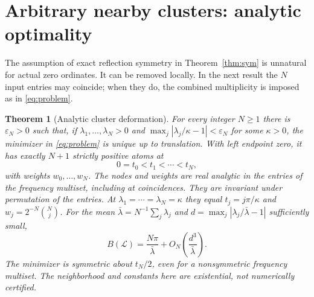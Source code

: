 \documentclass[11pt]{article}
\newtheorem{theorem}{Theorem}[section]
\theoremstyle{remark}\newtheorem{remark}[theorem]{Remark}
\begin{document}
\section{Arbitrary nearby clusters: analytic optimality}\label{sec:local}
The assumption of exact reflection symmetry in Theorem~\ref{thm:sym} is unnatural for actual zero ordinates. It can be removed locally. In the next result the $N$ input entries may coincide; when they do, the combined multiplicity is imposed as in \eqref{eq:problem}.
\begin{theorem}[Analytic cluster deformation]\label{thm:local}
For every integer $N\ge1$ there is $\varepsilon_N>0$ such that, if $\lambda_1,\ldots,\lambda_N>0$ and $\max_j|\lambda_j/\kappa-1|<\varepsilon_N$ for some $\kappa>0$, the minimizer in \eqref{eq:problem} is unique up to translation. With left endpoint zero, it has exactly $N+1$ strictly positive atoms at
\[
 0=t_0<t_1<\cdots<t_N,
\]
with weights $w_0,\ldots,w_N$. The nodes and weights are real analytic in the entries of the frequency multiset, including at coincidences. They are invariant under permutation of the entries. At $\lambda_1=\cdots=\lambda_N=\kappa$ they equal $t_j=j\pi/\kappa$ and $w_j=2^{-N}\binom Nj$. For the mean $\bar\lambda=N^{-1}\sum_j\lambda_j$ and $d=\max_j|\lambda_j/\bar\lambda-1|$ sufficiently small,
\begin{equation}\label{eq:width}
 B(\mathcal L)=\frac{N\pi}{\bar\lambda}+O_N\left(\frac{d^3}{\bar\lambda}\right).
\end{equation}
The minimizer is symmetric about $t_N/2$, even for a nonsymmetric frequency multiset. The neighborhood and constants here are existential, not numerically certified.
\end{theorem}
\end{document}
